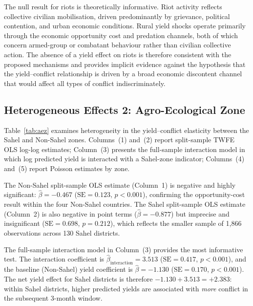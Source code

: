 The null result for riots is theoretically informative. Riot activity reflects collective civilian mobilisation, driven predominantly by grievance, political contention, and urban economic conditions. Rural yield shocks operate primarily through the economic opportunity cost and predation channels, both of which concern armed-group or combatant behaviour rather than civilian collective action. The absence of a yield effect on riots is therefore consistent with the proposed mechanisms and provides implicit evidence against the hypothesis that the yield--conflict relationship is driven by a broad economic discontent channel that would affect all types of conflict indiscriminately.

\subsection{Heterogeneous Effects 2: Agro-Ecological Zone}

Table~\ref{tab:aez} examines heterogeneity in the yield--conflict elasticity between the Sahel and Non-Sahel zones. Columns~(1) and~(2) report split-sample TWFE OLS log-log estimates; Column~(3) presents the full-sample interaction model in which log predicted yield is interacted with a Sahel-zone indicator; Columns~(4) and~(5) report Poisson estimates by zone.

\begin{table}[H]
\centering
\caption{Heterogeneous Effects by Agro-Ecological Zone: Sahel vs.\ Non-Sahel}
\label{tab:aez}
\begin{threeparttable}

\end{threeparttable}
\end{table}

The Non-Sahel split-sample OLS estimate (Column~1) is negative and highly significant: $\hat{\beta} = -0.467$ ($\text{SE} = 0.123$, $p < 0.001$), confirming the opportunity-cost result within the four Non-Sahel countries. The Sahel split-sample OLS estimate (Column~2) is also negative in point terms ($\hat{\beta} = -0.877$) but imprecise and insignificant ($\text{SE} = 0.698$, $p = 0.212$), which reflects the smaller sample of 1,866 observations across 130 Sahel districts.

The full-sample interaction model in Column~(3) provides the most informative test. The interaction coefficient is $\hat{\beta}_\text{interaction} = 3.513$ ($\text{SE} = 0.417$, $p < 0.001$), and the baseline (Non-Sahel) yield coefficient is $\hat{\beta} = -1.130$ ($\text{SE} = 0.170$, $p < 0.001$). The net yield effect for Sahel districts is therefore $-1.130 + 3.513 = +2.383$: within Sahel districts, higher predicted yields are associated with \textit{more} conflict in the subsequent 3-month window.

